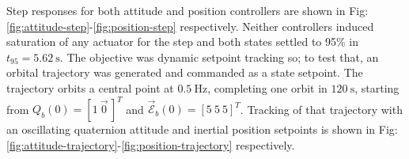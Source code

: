 \documentclass[a4paper, 10pt, conference]{ieeeconf}
\begin{document}
\par
Step responses for both attitude and position controllers are shown in Fig:\ref{fig:attitude-step}-\ref{fig:position-step} respectively. Neither controllers induced saturation of any actuator for the step and both states settled to 95\% in $t_{95}=5.62~\text{s}$. The objective was dynamic setpoint tracking so; to test that, an orbital trajectory was generated and commanded as a state setpoint. The trajectory orbits a central point at $0.5~\text{Hz}$, completing one orbit in $120~\text{s}$, starting from $Q_b(0)=[1~\vec{0}\hspace{2pt}]^T$ and $\vec{\mathcal{E}}_b(0)=[5~5~5]^T$. Tracking of that trajectory with an oscillating quaternion attitude and inertial position setpoints is shown in Fig:\ref{fig:attitude-trajectory}-\ref{fig:position-trajectory} respectively.
\end{document}
